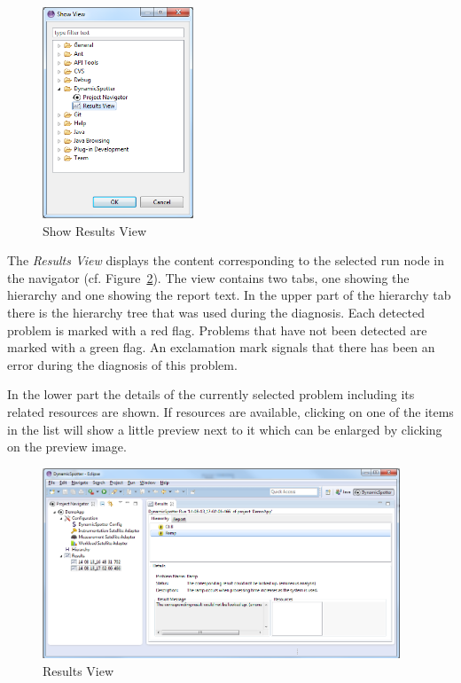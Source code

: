 \documentclass{report}
\begin{document}
\begin{figure}[h]
\centering
\includegraphics[width=0.4\textwidth]{figures/demo/0014-results-1.png}
\caption{Show Results View}
\label{fig:openResultsView}
\end{figure}

The \emph{Results View} displays the content corresponding to the selected run node in the navigator (cf. Figure~\ref{fig:resultsView}).
The view contains two tabs, one showing the hierarchy and one showing the report text.
In the upper part of the hierarchy tab there is the hierarchy tree that was used during the diagnosis.
Each detected problem is marked with a red flag. Problems that have not been detected are marked with a green flag.
An exclamation mark signals that there has been an error during the diagnosis of this problem.

In the lower part the details of the currently selected problem including its related resources are shown.
If resources are available, clicking on one of the items in the list will show a little preview next to it which can be enlarged by clicking on the preview image.

\begin{figure}[h]
\centering
\includegraphics[width=0.95\textwidth]{figures/demo/0014-results-2.png}
\caption{Results View}
\label{fig:resultsView}
\end{figure}
\end{document}
